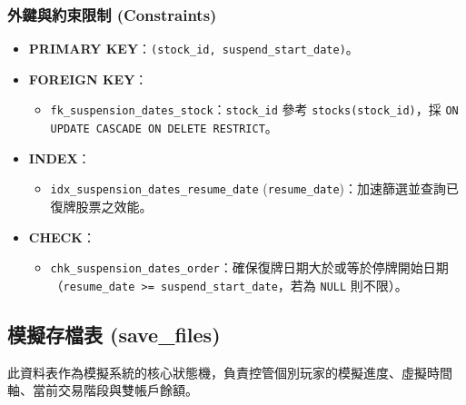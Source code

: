 \documentclass[UTF8, a4paper, 12pt, fontset=none]{ctexart}
\begin{document}
    \subsubsection*{外鍵與約束限制 (Constraints)}
    \begin{itemize}
        \item \textbf{PRIMARY KEY}：\texttt{(stock\_id, suspend\_start\_date)}。
        \item \textbf{FOREIGN KEY}：
            \begin{itemize}
                \item \texttt{fk\_suspension\_dates\_stock}：\texttt{stock\_id} 參考 \texttt{stocks(stock\_id)}，採 \texttt{ON UPDATE CASCADE ON DELETE RESTRICT}。
            \end{itemize}
        \item \textbf{INDEX}：
            \begin{itemize}
                \item \texttt{idx\_suspension\_dates\_resume\_date} (\texttt{resume\_date})：加速篩選並查詢已復牌股票之效能。
            \end{itemize}
        \item \textbf{CHECK}：
            \begin{itemize}
                \item \texttt{chk\_suspension\_dates\_order}：確保復牌日期大於或等於停牌開始日期\\（\texttt{resume\_date >= suspend\_start\_date}，若為 \texttt{NULL} 則不限）。
            \end{itemize}
    \end{itemize}

    \subsection{模擬存檔表 (save\_files)}
    

    此資料表作為模擬系統的核心狀態機，負責控管個別玩家的模擬進度、虛擬時間軸、當前交易階段與雙帳戶餘額。
\end{document}
